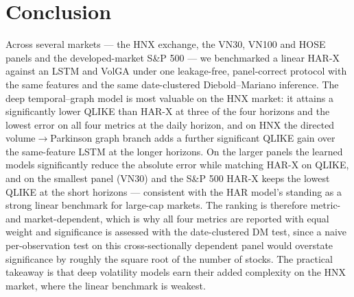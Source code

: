 \documentclass[runningheads]{llncs}
\begin{document}
\section{Conclusion}
Across several markets --- the HNX exchange, the VN30, VN100 and HOSE panels and the
developed-market S\&P 500 --- we benchmarked a linear HAR-X against an LSTM and VolGA under one
leakage-free, panel-correct protocol with the same features and the same date-clustered Diebold--Mariano
inference. The deep temporal--graph model is most valuable on the HNX market: it attains a
significantly lower QLIKE than HAR-X at three of the four horizons and the lowest error on all four metrics at
the daily horizon, and on HNX the directed volume$\to$Parkinson graph branch adds a further significant QLIKE
gain over the same-feature LSTM at the longer horizons. On the larger panels the learned models
significantly reduce the absolute error while matching HAR-X on QLIKE, and on the smallest panel (VN30) and the
S\&P 500 HAR-X keeps the lowest QLIKE at the short horizons --- consistent with the HAR model's standing as a
strong linear benchmark for large-cap markets. The ranking is therefore metric- and market-dependent, which
is why all four metrics are reported with equal weight and significance is assessed with the date-clustered DM
test, since a naive per-observation test on this cross-sectionally dependent panel would overstate significance
by roughly the square root of the number of stocks. The practical takeaway is that deep volatility models earn
their added complexity on the HNX market, where the linear benchmark is weakest.
\end{document}
